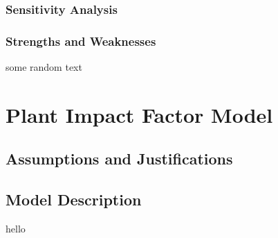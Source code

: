 \documentclass[12pt]{article}
\begin{document}
		\subsubsection{Sensitivity Analysis}
		
		\subsubsection{Strengths and Weaknesses}
	
			some random text
		
\section{Plant Impact Factor Model}

	\subsection{Assumptions and Justifications}
	
	\subsection{Model Description}

		hello
		
\end{document}
